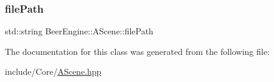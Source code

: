 \subsubsection{\texorpdfstring{file\+Path}{filePath}}
{\footnotesize\ttfamily std\+::string Beer\+Engine\+::\+A\+Scene\+::file\+Path}



The documentation for this class was generated from the following file\+:\begin{DoxyCompactItemize}
\item 
include/\+Core/\mbox{\hyperlink{_a_scene_8hpp}{A\+Scene.\+hpp}}\end{DoxyCompactItemize}
